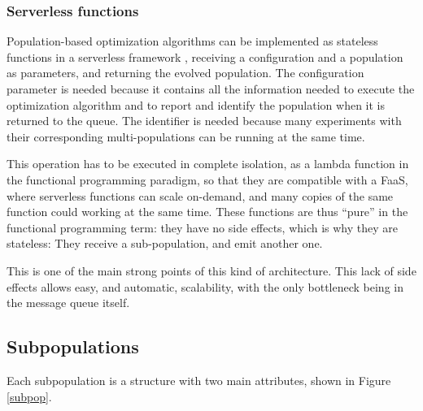 \documentclass[runningheads]{llncs}
\begin{document}
\subsubsection{Serverless functions}

Population-based optimization algorithms can be implemented
as stateless functions in a serverless framework  \cite{Roberts2016},
receiving a configuration and a population as 
parameters, and returning the evolved population. 
The configuration parameter is needed because it contains all
the information needed to execute the optimization algorithm
and to report and identify the population when it is returned to the queue. 
The identifier is needed because many experiments with their corresponding 
multi-populations can be running at the same time.


This operation has to be
executed in complete isolation, as a lambda function in the functional
programming paradigm, so that they are compatible with a FaaS, where serverless
functions can scale on-demand, and many copies of the same function could
working at the same time. %
These functions are thus ``pure'' in the functional programming term:
they have no side effects, which is why they are stateless: They
receive a sub-population, and emit another one.

This is one of the main strong points of this kind of
architecture. This lack of side effects allows easy, and automatic,
scalability, with the only bottleneck being in the message queue
itself.

\subsection{Subpopulations}

Each subpopulation is a structure with two main attributes, shown in
Figure \ref{subpop}.
\end{document}
